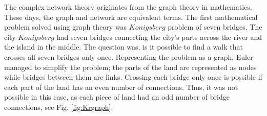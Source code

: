




The complex network theory originates from the graph theory in mathematics. These days, the graph and network are equivalent terms. The first mathematical problem solved using graph theory was $Konigsberg$ problem of seven bridges. The city $Konigsberg$ had seven bridges connecting the city's parts across the river and the island in the middle. The question was, is it possible to find a walk that crosses all seven bridges only once. Representing the problem as a graph, Euler managed to simplify the problem; the parts of the land are represented as nodes while bridges between them are links. Crossing each bridge only once is possible if each part of the land has an even number of connections. Thus, it was not possible in this case, as each piece of land had an odd number of bridge connections, see Fig. \ref{fig:Krgraph}.


